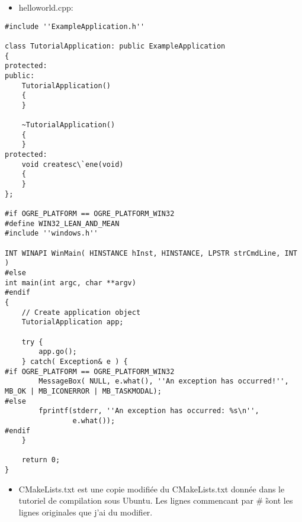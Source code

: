 \documentclass[10pt,a4paper]{report}
\begin{document}
\begin{itemize}
\item helloworld.cpp:
\end{itemize}

\begin{lstlisting}
#include ''ExampleApplication.h''
 
class TutorialApplication: public ExampleApplication
{
protected:
public:
    TutorialApplication()
    {
    }
 
    ~TutorialApplication()
    {
    }
protected:
    void createsc\`ene(void)
    {
    }
};
 
#if OGRE_PLATFORM == OGRE_PLATFORM_WIN32
#define WIN32_LEAN_AND_MEAN
#include ''windows.h''
 
INT WINAPI WinMain( HINSTANCE hInst, HINSTANCE, LPSTR strCmdLine, INT )
#else
int main(int argc, char **argv)
#endif
{
    // Create application object
    TutorialApplication app;
 
    try {
        app.go();
    } catch( Exception& e ) {
#if OGRE_PLATFORM == OGRE_PLATFORM_WIN32
        MessageBox( NULL, e.what(), ''An exception has occurred!'', MB_OK | MB_ICONERROR | MB_TASKMODAL);
#else
        fprintf(stderr, ''An exception has occurred: %s\n'',
                e.what());
#endif
    }
 
    return 0;
}
\end{lstlisting}



\begin{itemize}
\item CMakeLists.txt est une copie modifi\'ee du CMakeLists.txt donn\'ee dans le tutoriel de compilation sous Ubuntu. Les lignes commencant par \# \~ sont les lignes originales que j'ai du modifier.
\end{itemize}
\end{document}
